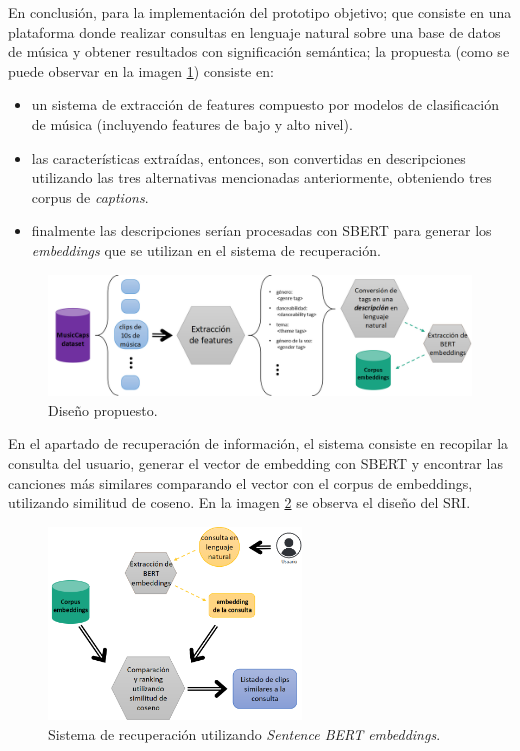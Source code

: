 En conclusión, para la implementación del prototipo objetivo; que consiste en una plataforma donde realizar consultas en lenguaje natural sobre una base de datos de música y obtener resultados con significación semántica; la propuesta (como se puede observar en la imagen \ref{fig:corpus_embeddings}) consiste en:
\begin{itemize}
    \item un sistema de extracción de features compuesto por modelos de clasificación de música (incluyendo features de bajo y alto nivel).
    \item las características extraídas, entonces, son convertidas en descripciones utilizando las tres alternativas mencionadas anteriormente, obteniendo tres corpus de \textit{captions}.
    \item finalmente las descripciones serían procesadas con SBERT para generar los \textit{embeddings} que se utilizan en el sistema de recuperación.
\end{itemize}
\begin{figure}[h]
	\centering
	\includegraphics[width=\textwidth]{Graphics/corpus_embeddings.png}
	\caption{Diseño propuesto.} 
    \label{fig:corpus_embeddings}
\end{figure}
En el apartado de recuperación de información, el sistema consiste en recopilar la consulta del usuario, generar el vector de embedding con SBERT y encontrar las canciones más similares comparando el vector con el corpus de embeddings, utilizando similitud de coseno. En la imagen \ref{fig:sri_design} se observa el diseño del SRI. 
\begin{figure}[h]
	\centering
	\includegraphics[width=0.6\textwidth]{Graphics/SRI.png}
	\caption{Sistema de recuperación utilizando \textit{Sentence BERT embeddings}.} 
    \label{fig:sri_design}
\end{figure}
